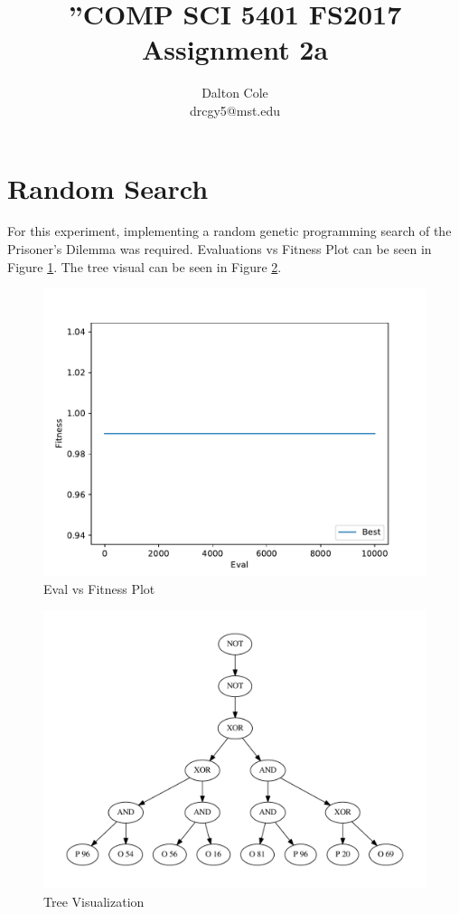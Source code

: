 \documentclass[times]{article}
\begin{document}
	\title{”COMP SCI 5401 FS2017 Assignment 2a}
	\author{Dalton Cole \\ drcgy5@mst.edu}
	\date{}
	\maketitle

	\section{Random Search}
	For this experiment, implementing a random genetic programming search of the Prisoner's Dilemma was required. Evaluations vs Fitness Plot can be seen in Figure \ref{fig:plot}. The tree visual can be seen in Figure \ref{fig:tree}.

	\begin{figure}
		\caption{Eval vs Fitness Plot}
		\label{fig:plot}
		\includegraphics[width=\textwidth]{../graph/chart/0.pdf}
	\end{figure}

	\begin{figure}
		\caption{Tree Visualization}
		\label{fig:tree}
		\includegraphics[angle=90,origin=c,width=\textwidth,height=\textheight]{../graph/tree/0.pdf}
	\end{figure}


		
\end{document}
